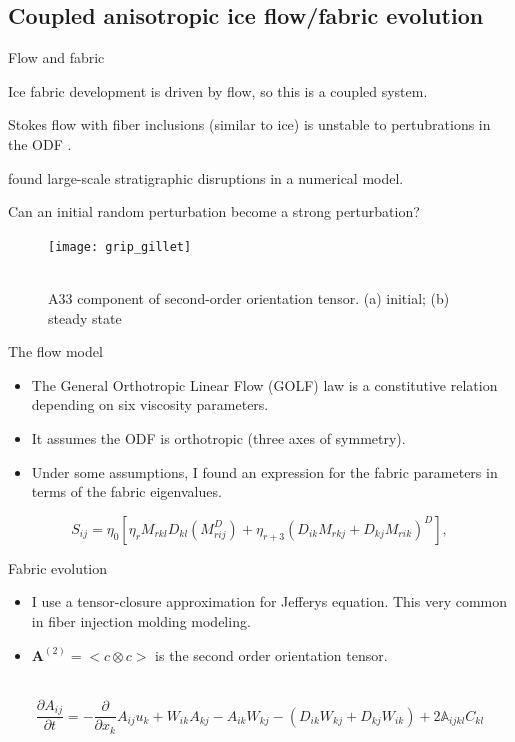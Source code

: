 \documentclass{beamer}
\begin{document}
\subsection{Coupled anisotropic ice flow/fabric evolution}
\begin{frame}{Flow and fabric}
      \begin{itemize} \small{
   \item Ice fabric development is driven by flow, so this is a coupled system.
   \item Stokes flow with fiber inclusions (similar to ice) is unstable to pertubrations in the ODF \citep{montgomery-smith2011}.
   \item \citet{gillet2006} found large-scale stratigraphic disruptions in a numerical model.
   \item Can an initial random perturbation become a strong perturbation?
   }
\end{itemize} 
\begin{figure}
   \texttt{[image: grip\_gillet]}
   \caption{\tiny{\\ A33 component of second-order orientation tensor. (a) initial; (b) steady state \citet{gillet2006}}}

\end{figure}
\end{frame}


\begin{frame}{The flow model}
   \begin{itemize}
      \item The General Orthotropic Linear Flow (GOLF) law \citep{gillet2005} is a constitutive relation depending on six viscosity parameters.
      \item It assumes the ODF is orthotropic (three axes of symmetry).
      \item Under some assumptions, I found an expression for the fabric parameters in terms of the fabric eigenvalues.
   \end{itemize}
   \begin{equation}
   S_{ij} = \eta_0 \left[ \eta_r M_{rkl} D_{kl} \left( M_{rij}^D \right)  + \eta_{r+3} \left( D_{ik} M_{rkj} + D_{kj} M_{rik} \right)^D \right],
   \end{equation}
\end{frame}

\begin{frame}{Fabric evolution}
   \begin{itemize}
      \item I use a tensor-closure approximation for Jefferys equation. This very common in fiber injection molding modeling. 
      \item $\mathbf{A}^{(2)}= < c \otimes c>$ is the second order orientation tensor. 
   \end{itemize} \\
   \begin{equation}
      \frac{\partial A_{ij}}{\partial t} = -\frac{\partial}{\partial x_k} A_{ij} u_k + W_{ik} A_{kj} - A_{ik} W_{kj} - (D_{ik}W_{kj} + D_{kj}W_{ik}) + 2 \mathbb{A}_{ijkl} C_{kl}
   \end{equation}

\end{frame}
\end{document}
